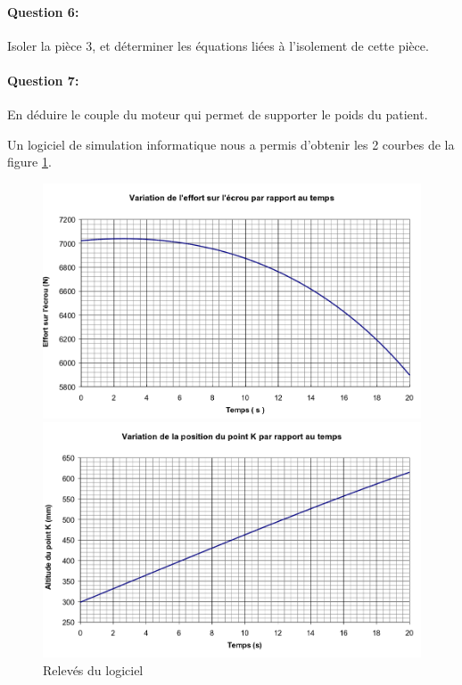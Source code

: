 \paragraph{Question 6:} Isoler la pièce 3, et déterminer les équations liées à l'isolement de cette pièce.

\paragraph{Question 7:} En déduire le couple du moteur qui permet de supporter le poids du patient.

Un logiciel de simulation informatique nous a permis d'obtenir les 2 courbes de la figure \ref{releves}.

\begin{figure}[!h]
 \begin{minipage}{0.45\linewidth}
 \centering\includegraphics[width=0.9\linewidth]{img/courbe1.png}
 \end{minipage}
 \hfill
 \begin{minipage}{0.45\linewidth}
 \centering\includegraphics[width=0.9\linewidth]{img/courbe2.png}
 \end{minipage}
 \caption{Relevés du logiciel}
 \label{releves}
\end{figure}

